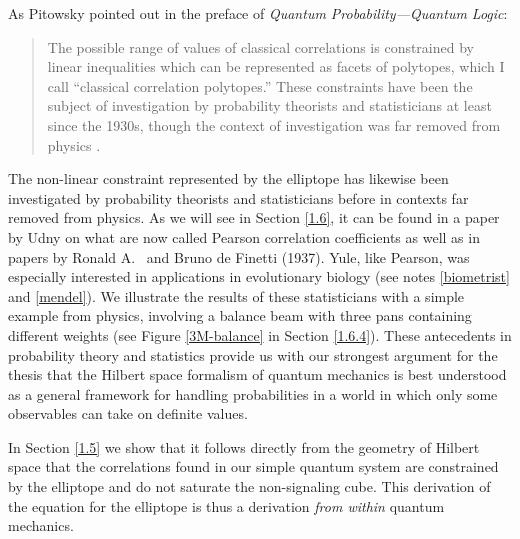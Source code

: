 As Pitowsky pointed out in the preface of  \emph{Quantum Probability---Quantum Logic}:  
\begin{quote}
The possible range of values of classical correlations is constrained by linear inequalities which can be represented as facets of polytopes, which I call ``classical correlation polytopes.'' These constraints have been the subject of investigation by probability theorists and statisticians at least since the 1930s, though the context of investigation was far removed from physics %
\citep[p.\ IV]{Pitowsky 1989a}.
\end{quote}
The non-linear constraint represented by the elliptope has likewise been investigated by probability theorists and statisticians before in contexts far removed from physics. As we will see in Section \ref{1.6}, it can be found in a paper by Udny \citet{Yule 1896} on what are now called Pearson correlation coefficients as well as in papers by Ronald A.\ \citet{Fisher 1924} and Bruno de Finetti (1937).
Yule, like Pearson, was especially interested in applications in evolutionary biology (see notes \ref{biometrist} and \ref{mendel}). We illustrate the results of these statisticians with a simple example from physics, involving a balance beam with three pans containing different weights (see Figure \ref{3M-balance} in Section \ref{1.6.4}). These antecedents in probability theory and statistics provide us with our strongest argument for the thesis that the Hilbert space formalism of quantum mechanics is best understood as a general framework for handling probabilities in a world in which only some observables can take on definite values. 

In Section \ref{1.5} we show that it follows directly from the geometry of Hilbert space that the correlations found in our simple quantum system are constrained by the elliptope and do not 
 saturate the non-signaling cube. This  derivation of the equation for the elliptope is thus a derivation \emph{from within} quantum mechanics.

